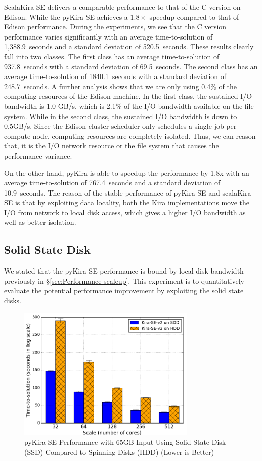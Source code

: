 \documentclass[10pt,journal,compsoc]{IEEEtran}
\begin{document}
ScalaKira SE delivers a comparable performance to that of the C version on Edison. 
While the pyKira SE achieves a $1.8\times$ speedup compared to that of Edison performance.
During the experiments, we see that the C version performance varies significantly with an 
average time-to-solution of 1,388.9~seconds and a standard deviation of 520.5~seconds. 
These results clearly fall into two classes. The first class has an average time-to-solution of 937.8~seconds
with a standard deviation of 69.5~seconds. The second class has an average time-to-solution 
of 1840.1~seconds with a standard deviation of 248.7~seconds. A further analysis shows that we are only 
using 0.4\% of the computing resources of the Edison machine. In the first class, the sustained
I/O bandwidth is 1.0 GB/s, which is 2.1\% of the I/O bandwidth available on the file system.
While in the second class, the sustained I/O bandwidth is down to 0.5GB/s.
Since the Edison cluster scheduler only schedules a single job per compute node, computing resources 
are completely isolated. Thus, we can reason that, it is the I/O network resource or the file system 
that causes the performance variance. 

On the other hand, pyKira is able to speedup the performance by 1.8x with an average time-to-solution of
767.4~seconds and a standard deviation of 10.9~seconds. The reason of the stable performance of pyKira SE
and scalaKira SE is that by exploiting data locality, both the Kira implementations move the I/O from network
to local disk access, which gives a higher I/O bandwidth as well as better isolation.

\subsection{Solid State Disk}
We stated that the pyKira SE performance is bound by local disk bandwidth previously in \S\ref{sec:Performance-scaleup}.
This experiment is to quantitatively evaluate the potential performance improvement by exploiting the solid state disks.

\begin{figure}[h]
	\begin{center}
		\includegraphics[width=85mm]{pictures/ssd-65GB}
		\caption{pyKira SE Performance with 65GB Input Using Solid State Disk (SSD) Compared to Spinning Disks (HDD)  (Lower is Better)
		\label{fig:ssd-65GB}}
  	\end{center}
\end{figure}
\end{document}
